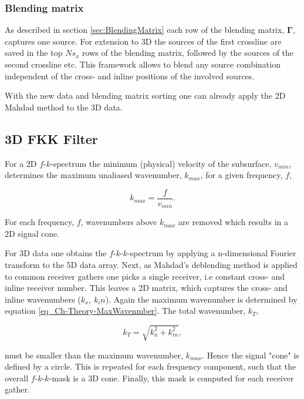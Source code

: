 \subsubsection*{Blending matrix}

As described in section \ref{sec:BlendingMatrix} each row of the blending matrix, $\mathbf{\Gamma}$, captures one source. For extension to 3D the sources of the first crossline are saved in the top $Ns_x$ rows of the blending matrix, followed by the sources of the second crossline etc. This framework allows to blend any source combination independent of the cross- and inline positions of the involved sources.

With the new data and blending matrix sorting one can already apply the 2D Mahdad method to the 3D data.


\subsection{3D FKK Filter} \label{sec:Ch-Theory-3dExtension-FKK}

For a 2D $f$-$k$-spectrum the minimum (physical) velocity of the subsurface, $v_{min}$, determines the maximum unaliased wavenumber, $k_{max}$,  for a given frequency, $f$,

\begin{equation}
	k_{max} = \frac{f}{v_{min}}.
	\label{eq_Ch-Theory-MaxWavenmber}
\end{equation} 

For each frequency, $f$, wavenumbers above $k_{max}$ are removed which results in a 2D signal cone.

For 3D data one obtains the $f$-$k$-$k$-spectrum by applying a n-dimensional Fourier transform to the 5D data array. Next, as Mahdad's deblending method is applied to common receiver gathers one picks a single receiver, i.e constant cross- and inline receiver number. This leaves a 2D matrix, which captures the cross- and inline wavenumbers ($k_x$, $k_in$). Again the maximum wavenumber is determined by equation \ref{eq_Ch-Theory-MaxWavenmber}. The total wavenumber, $k_{T}$,

\begin{equation}
	k_{T} = \sqrt{k_x^2 + k_{in}^2},
	\label{eq:Ch-Theory-TotalWavenumber}
\end{equation}

must be smaller than the maximum wavenumber, $k_{max}$. Hence the signal "cone" is defined by a circle. This is repeated for each frequency component, such that the overall $f$-$k$-$k$-mask is a 3D cone. Finally, this mask is computed for each receiver gather.

